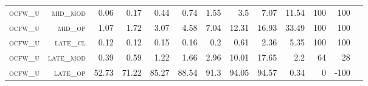 \begin{landscape}
\begin{table}[!htbp]
\begin{tabular}{@{}rrrrrrrrrr|rrr@{}}
\footnotesize \textsc{ocfw\_u}     & \footnotesize \textsc{mid\_mod  }                & \footnotesize 0.06          & \footnotesize 0.17           & \footnotesize 0.44             & \footnotesize 0.74            & \footnotesize 1.55            & \footnotesize 3.5             & \footnotesize 7.07       & \footnotesize 11.54    & \footnotesize 100    & \footnotesize 100    \\
\footnotesize \textsc{ocfw\_u}     & \footnotesize \textsc{mid\_op   }                & \footnotesize 1.07          & \footnotesize 1.72           & \footnotesize 3.07             & \footnotesize 4.58            & \footnotesize 7.04            & \footnotesize 12.31           & \footnotesize 16.93      & \footnotesize 33.49    & \footnotesize 100    & \footnotesize 100    \\
\footnotesize \textsc{ocfw\_u}     & \footnotesize \textsc{late\_cl  }                & \footnotesize 0.12          & \footnotesize 0.12           & \footnotesize 0.15             & \footnotesize 0.16            & \footnotesize 0.2             & \footnotesize 0.61            & \footnotesize 2.36       & \footnotesize 5.35     & \footnotesize 100    & \footnotesize 100    \\
\footnotesize \textsc{ocfw\_u}     & \footnotesize \textsc{late\_mod }                & \footnotesize 0.39          & \footnotesize 0.59           & \footnotesize 1.22             & \footnotesize 1.66            & \footnotesize 2.96            & \footnotesize 10.01           & \footnotesize 17.65      & \footnotesize 2.2      & \footnotesize 64     & \footnotesize 28    \\
\footnotesize \textsc{ocfw\_u}     & \footnotesize \textsc{late\_op  }                & \footnotesize 52.73         & \footnotesize 71.22          & \footnotesize 85.27            & \footnotesize 88.54           & \footnotesize 91.3            & \footnotesize 94.05           & \footnotesize 94.57      & \footnotesize 0.34     & \footnotesize 0      & \footnotesize -100    \\
\end{tabular}
\end{table}
\end{landscape}

